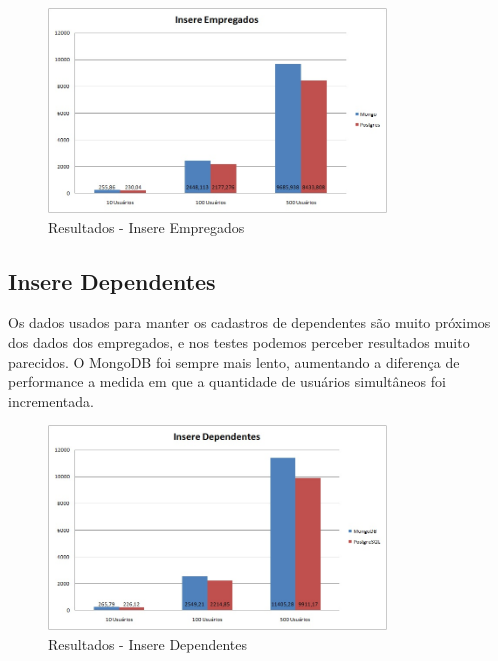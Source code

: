 \begin{figure}[!htbp]
	\begin{center}
		\includegraphics[width=0.8\textwidth]{resultados/insere_empregados}
	\end{center}
	\caption{Resultados - Insere Empregados}
	\label{fig:resultinsereempregados}
\end{figure}

\subsection{Insere Dependentes}

Os dados usados para manter os cadastros de dependentes são muito próximos dos dados dos empregados, e nos testes podemos perceber resultados muito parecidos. O MongoDB foi sempre mais lento, aumentando a diferença de performance a medida em que a quantidade de usuários simultâneos foi incrementada.

\begin{figure}[!htbp]
	\begin{center}
		\includegraphics[width=0.8\textwidth]{resultados/insere_dependentes}
	\end{center}
	\caption{Resultados - Insere Dependentes}
	\label{fig:resultinseredependentes}
\end{figure}

